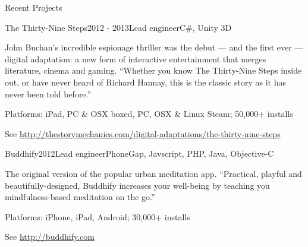 \documentclass{resume} %
\begin{document}
\begin{rSection}{Recent Projects}
\begin{rSubsection}{The Thirty-Nine Steps}{2012 - 2013}{Lead engineer}{C\#, Unity 3D}
\item John Buchan’s incredible espionage thriller was the debut --- and the first ever --- digital adaptation: a new form of interactive entertainment that merges literature, cinema and gaming. ``Whether you know The Thirty-Nine Steps inside out, or have never heard of Richard Hannay, this is the classic story as it has never been told before.''
\item Platforms: iPad, PC \& OSX boxed, PC, OSX \& Linux Steam; 50,000+ installs
\item See \url{http://thestorymechanics.com/digital-adaptations/the-thirty-nine-steps}
\end{rSubsection}

\begin{rSubsection}{Buddhify}{2012}{Lead engineer}{PhoneGap, Javscript, PHP, Java, Objective-C}
\item The original version of the popular urban meditation app. ``Practical, playful and beautifully-designed, Buddhify increases your well-being by teaching you mindfulness-based meditation on the go.''
\item Platforms: iPhone, iPad, Android; 30,000+ installs
\item See \url{http://buddhify.com}
\end{rSubsection}



\end{rSection}



\end{document}
